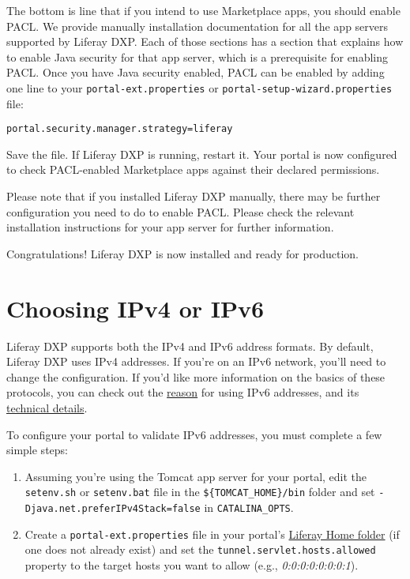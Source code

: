 The bottom is line that if you intend to use Marketplace apps, you
should enable PACL. We provide manually installation documentation for
all the app servers supported by Liferay DXP. Each of those sections has
a section that explains how to enable Java security for that app
server, which is a prerequisite for enabling PACL. Once you have Java
security enabled, PACL can be enabled by adding one line to your
\texttt{portal-ext.properties} or
\texttt{portal-setup-wizard.properties} file:

\begin{verbatim}
portal.security.manager.strategy=liferay
\end{verbatim}

Save the file. If Liferay DXP is running, restart it. Your portal is now
configured to check PACL-enabled Marketplace apps against their declared
permissions.

Please note that if you installed Liferay DXP manually, there may be
further configuration you need to do to enable PACL. Please check the
relevant installation instructions for your app server for further
information.

Congratulations! Liferay DXP is now installed and ready for production.

\section{Choosing IPv4 or IPv6}\label{choosing-ipv4-or-ipv6}

Liferay DXP supports both the IPv4 and IPv6 address formats. By default,
Liferay DXP uses IPv4 addresses. If you're on an IPv6 network, you'll
need to change the configuration. If you'd like more information on the
basics of these protocols, you can check out the
\href{http://www.google.com/intl/en/ipv6/}{reason} for using IPv6
addresses, and its \href{http://en.wikipedia.org/wiki/IPv6}{technical
details}.

To configure your portal to validate IPv6 addresses, you must complete a
few simple steps:

\begin{enumerate}
\def\labelenumi{\arabic{enumi}.}
\tightlist
\item
  Assuming you're using the Tomcat app server for your portal, edit the
  \texttt{setenv.sh} or \texttt{setenv.bat} file in the
  \texttt{\$\{TOMCAT\_HOME\}/bin} folder and set
  \texttt{-Djava.net.preferIPv4Stack=false} in \texttt{CATALINA\_OPTS}.
\item
  Create a \texttt{portal-ext.properties} file in your portal's
  \href{/docs/7-0/deploy/-/knowledge_base/d/installing-product\#liferay-home}{Liferay
  Home folder} (if one does not already exist) and set the
  \texttt{tunnel.servlet.hosts.allowed} property to the target hosts you
  want to allow (e.g., \emph{0:0:0:0:0:0:0:1}).
\end{enumerate}

